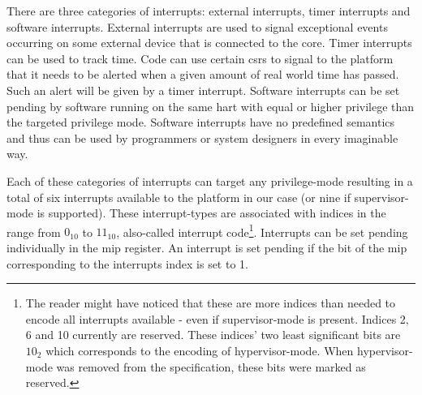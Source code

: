 There are three categories of interrupts: external interrupts, timer interrupts and software interrupts.
External interrupts are used to signal exceptional events occurring on some external device that is connected to the core.
Timer interrupts can be used to track time.
Code can use certain \glspl{csr} to signal to the platform that it needs to be alerted when a given amount of real world time has passed.
Such an alert will be given by a timer interrupt.
Software interrupts can be set pending by software running on the same \gls{hart} with equal or higher privilege than the targeted privilege mode.
Software interrupts have no predefined semantics and thus can be used by programmers or system designers in every imaginable way.

Each of these categories of interrupts can target any privilege-mode resulting in a total of six interrupts available to the platform in our case (or nine if supervisor-mode is supported).
These interrupt-types are associated with indices in the range from $ 0_{10} $ to $ 11_{10} $, also-called interrupt code\footnote{%
    The reader might have noticed that these are more indices than needed to encode all interrupts available - even if supervisor-mode is present.
    Indices 2, 6 and 10 currently are reserved.
    These indices' two least significant bits are $ 10_2 $ which corresponds to the encoding of hypervisor-mode.
    When hypervisor-mode was removed from the specification, these bits were marked as reserved.
}.
Interrupts can be set pending individually in the \gls{mip} register.
An interrupt is set pending if the bit of the \gls{mip} corresponding to the interrupts index is set to 1.

